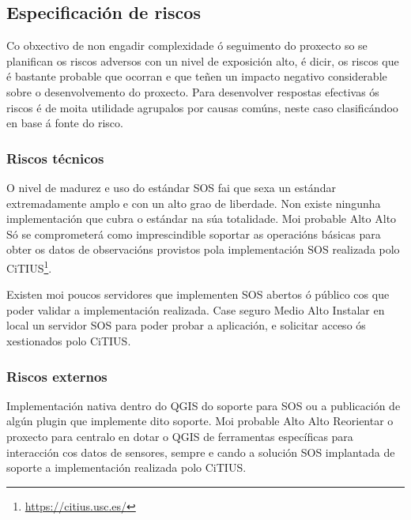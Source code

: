\subsection{Especificación de riscos}
Co obxectivo de non engadir complexidade ó seguimento do proxecto so se planifican os riscos adversos con un nivel de exposición alto, é dicir, os riscos que é bastante probable que ocorran e que teñen un impacto negativo considerable sobre o desenvolvemento do proxecto. Para desenvolver respostas efectivas ós riscos é de moita utilidade agrupalos por causas comúns, neste caso clasificándoo en base á fonte do risco.

\subsubsection{Riscos técnicos}
		  	{O nivel de madurez e uso do estándar SOS fai que sexa un estándar extremadamente amplo e con un alto grao de liberdade. Non existe ningunha implementación que cubra o estándar na súa totalidade.}
			{Moi probable} %
			{Alto} %
			{Alto} %
			{Só se comprometerá como imprescindible soportar as operacións básicas para obter os datos de observacións provistos pola implementación SOS realizada polo CiTIUS\footnote{\url{https://citius.usc.es/}}.}

		  	{Existen moi poucos servidores que implementen SOS abertos ó público cos que poder validar a implementación realizada.}
			{Case seguro} %
			{Medio} %
			{Alto} %
			{Instalar en local un servidor SOS para poder probar a aplicación, e solicitar acceso ós xestionados polo CiTIUS.}
			
\subsubsection{Riscos externos}
		  	{Implementación nativa dentro do QGIS do soporte para SOS ou a publicación de algún plugin que implemente dito soporte.}
			{Moi probable} %
			{Alto} %
			{Alto} %
			{Reorientar o proxecto para centralo en dotar o QGIS de ferramentas específicas para interacción cos datos de sensores, sempre e cando a solución SOS implantada de soporte a implementación realizada polo CiTIUS.}

